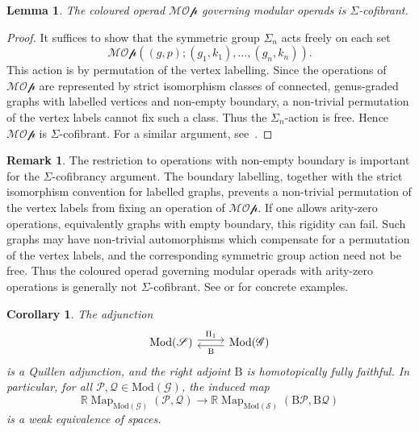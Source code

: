 \documentclass{amsart}
\newcommand{\sSet}{\mathscr{S}}
\newcommand{\Grpd}{\mathscr{G}}
\newcommand{\Mod}{\mathrm{Mod}}
\newcommand{\cs}{\mathrm{B}}
\newcommand{\Map}{\operatorname{Map}}
\newtheorem{lemma}[theorem]{Lemma}%
\newtheorem{cor}[theorem]{Corollary}%
\theoremstyle{definition}
\newtheorem{remark}[theorem]{Remark}%
\numberwithin{equation}{section}
\begin{document}
\begin{lemma}\label{lemma: MO is Sigma cofibrant}
The coloured operad $\mathcal{MOp}$ governing modular operads is $\Sigma$-cofibrant.
\end{lemma}

\begin{proof}
It suffices to show that the symmetric group $\Sigma_n$ acts freely on each set
\[
\mathcal{MOp}((g,p);(g_1,k_1),\ldots,(g_n,k_n)).
\]
This action is by permutation of the vertex labelling. Since the operations of $\mathcal{MOp}$ are represented by strict isomorphism classes of connected, genus-graded graphs with labelled vertices and non-empty boundary, a non-trivial permutation of the vertex labels cannot fix such a class. Thus the $\Sigma_n$-action is free. Hence $\mathcal{MOp}$ is $\Sigma$-cofibrant. For a similar argument, see~\cite[Proposition~4.13]{hry_shrink}.
\end{proof}

\begin{remark}
The restriction to operations with non-empty boundary is important for the $\Sigma$-cofibrancy argument. The boundary labelling, together with the strict isomorphism convention for labelled graphs, prevents a non-trivial permutation of the vertex labels from fixing an operation of $\mathcal{MOp}$. If one allows arity-zero operations, equivalently graphs with empty boundary, this rigidity can fail. Such graphs may have non-trivial automorphisms which compensate for a permutation of the vertex labels, and the corresponding symmetric group action need not be free. Thus the coloured operad governing modular operads with arity-zero operations is generally not $\Sigma$-cofibrant. See \cite[Example~6.3]{hry_shrink} or \cite[Figure~2]{deshmukh2022homotopical} for concrete examples.
\end{remark}

\begin{cor}\label{lemma: B is homotopically fully faithful}
The adjunction
\[
\begin{tikzcd}
\Mod(\sSet) \arrow[r, shift left=1, "\Pi_{1}"] & \Mod(\Grpd) \arrow[l, shift left=1, "\cs"]
\end{tikzcd}
\]
is a Quillen adjunction, and the right adjoint $\cs$ is homotopically fully faithful. In particular, for all $\mathcal{P},\mathcal{Q}\in\Mod(\Grpd)$, the induced map
\[
\mathbb{R}\Map_{\Mod(\Grpd)}(\mathcal{P},\mathcal{Q})
\longrightarrow
\mathbb{R}\Map_{\Mod(\sSet)}(\cs\mathcal{P},\cs\mathcal{Q})
\]
is a weak equivalence of spaces.
\end{cor}
\end{document}
